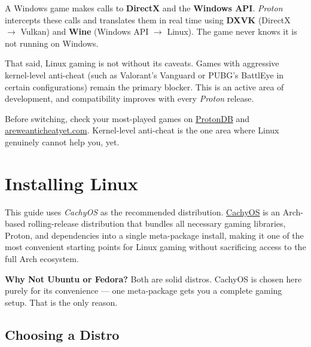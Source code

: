 \documentclass{article}
\begin{document}
\begin{tcolorbox}[arc=12pt, outer arc=10pt,
  colback=blue!4!white, colframe=blue!40!black,
  title=\textbf{How Proton Works}]
  A Windows game makes calls to \textbf{DirectX} and the \textbf{Windows API}. \textit{Proton} intercepts these calls and translates them in real time using \textbf{DXVK} (DirectX $\rightarrow$ Vulkan) and \textbf{Wine} (Windows API $\rightarrow$ Linux). The game never knows it is not running on Windows.
\end{tcolorbox}

\noindent That said, Linux gaming is not without its caveats. Games with aggressive
kernel-level anti-cheat (such as Valorant's Vanguard or PUBG's BattlEye in certain configurations) remain the primary blocker. This is an active area of
development, and compatibility improves with every \textit{Proton} release.

\begin{tcolorbox}[arc=12pt, outer arc=10pt,
  colback=red!5!white, colframe=red!60!black,
  title=\textbf{Anti-Cheat Warning}]
  Before switching, check your most-played games on
  \href{https://www.protondb.com}{ProtonDB} and \href{https://areweanticheatyet.com}{areweanticheatyet.com}. Kernel-level anti-cheat is the one area where Linux genuinely cannot help you, yet.
\end{tcolorbox}

\newpage \section{Installing Linux}

This guide uses \textit{CachyOS} as the recommended distribution.
\href{https://cachyos.org}{CachyOS} is an Arch-based rolling-release distribution that bundles all necessary gaming libraries, Proton, and dependencies into a single
meta-package install, making it one of the most convenient starting points for Linux gaming without sacrificing access to the full Arch ecosystem.
\begin{callout}{\textbf{Why Not Ubuntu or Fedora?}}
  Both are solid distros. CachyOS is chosen here purely for its convenience ---
  one meta-package gets you a complete gaming setup. That is the only reason.
\end{callout}

\subsection{Choosing a Distro}
\end{document}
